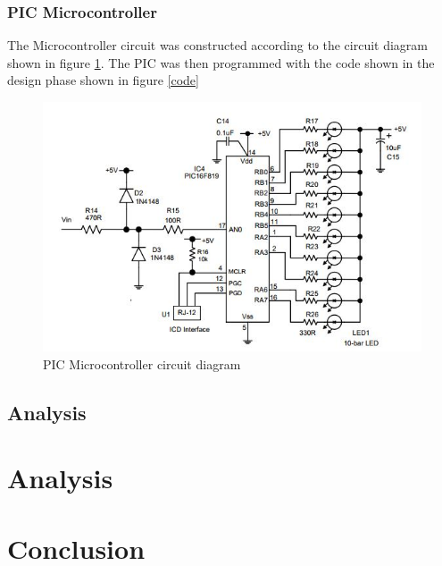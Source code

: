 \documentclass[10pt,a4paper]{article}
\begin{document}
\subsubsection{PIC Microcontroller}
The Microcontroller circuit was constructed according to the circuit diagram shown in figure \ref{PIC}. The PIC was then programmed with the code shown in the design phase shown in figure \ref{code}

\begin{figure}
\includegraphics[width = \textwidth]{PIC}
\caption{PIC Microcontroller circuit diagram}
\label{PIC}
\end{figure} 



\subsection{Analysis}

\section{Analysis}

\section{Conclusion}

\printbibliography
\end{document}

